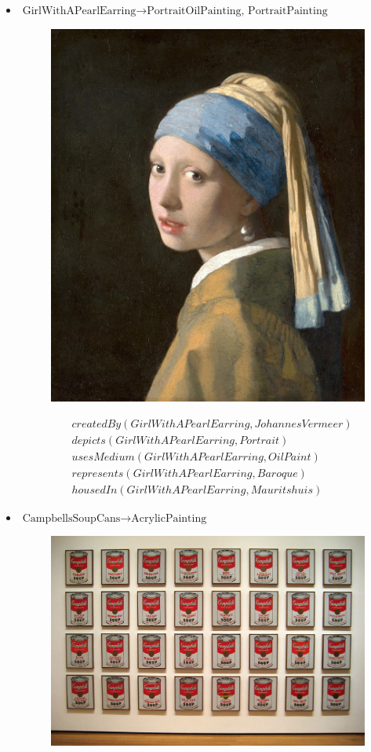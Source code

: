 \documentclass{article}
\begin{document}
\begin{itemize}
  \item $\text{GirlWithAPearlEarring} \to \text{PortraitOilPainting, PortraitPainting}$
    \begin{figure}[H]
      \centering
      \includegraphics[width=0.35\linewidth]{images/girlwithpearlearring.jpg}
    \end{figure}
    \begin{align*}
      &createdBy(GirlWithAPearlEarring, JohannesVermeer)\\
      &depicts(GirlWithAPearlEarring, Portrait)\\
      &usesMedium(GirlWithAPearlEarring, OilPaint)\\
      &represents(GirlWithAPearlEarring, Baroque)\\
      &housedIn(GirlWithAPearlEarring, Mauritshuis)
    \end{align*}
  \item $\text{CampbellsSoupCans} \to \text{AcrylicPainting}$
    \begin{figure}[H]
      \centering
      \includegraphics[width=\linewidth]{images/campbellcans.jpg}
    \end{figure}
    \begin{align*}

\end{align*}
\end{itemize}
\end{document}
